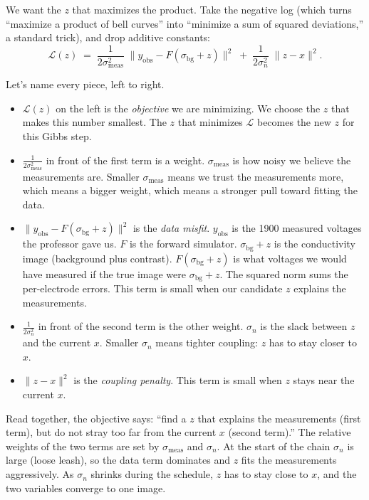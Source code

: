 \documentclass[11pt]{article}
\newcommand{\norm}[1]{\lVert #1 \rVert}
\begin{document}
We want the $z$ that maximizes the product. Take the negative log
(which turns ``maximize a product of bell curves'' into ``minimize a
sum of squared deviations,'' a standard trick), and drop additive
constants:
\[
\boxed{\;\;
\mathcal{L}(z)
\;=\;
\frac{1}{2 \sigma_{\text{meas}}^2}\;\norm{y_{\text{obs}} - F(\sigma_{\text{bg}} + z)}^2
\;+\;
\frac{1}{2 \sigma_n^2}\;\norm{z - x}^2. \;\;}
\]

Let's name every piece, left to right.

\begin{itemize}[leftmargin=2em]
\item $\mathcal{L}(z)$ on the left is the \emph{objective} we are
  minimizing. We choose the $z$ that makes this number smallest. The
  $z$ that minimizes $\mathcal{L}$ becomes the new $z$ for this Gibbs
  step.
\item $\frac{1}{2\sigma_{\text{meas}}^2}$ in front of the first term is
  a weight. $\sigma_{\text{meas}}$ is how noisy we believe the
  measurements are. Smaller $\sigma_{\text{meas}}$ means we trust the
  measurements more, which means a bigger weight, which means a
  stronger pull toward fitting the data.
\item $\norm{y_{\text{obs}} - F(\sigma_{\text{bg}} + z)}^2$ is the
  \emph{data misfit}. $y_{\text{obs}}$ is the 1900 measured voltages
  the professor gave us. $F$ is the forward simulator. $\sigma_{\text{bg}} + z$
  is the conductivity image (background plus contrast). $F(\sigma_{\text{bg}} + z)$
  is what voltages we would have measured if the true image were
  $\sigma_{\text{bg}} + z$. The squared norm sums the per-electrode
  errors. This term is small when our candidate $z$ explains the
  measurements.
\item $\frac{1}{2 \sigma_n^2}$ in front of the second term is the
  other weight. $\sigma_n$ is the slack between $z$ and the current
  $x$. Smaller $\sigma_n$ means tighter coupling: $z$ has to stay
  closer to $x$.
\item $\norm{z - x}^2$ is the \emph{coupling penalty}. This term is
  small when $z$ stays near the current $x$.
\end{itemize}

Read together, the objective says: ``find a $z$ that explains the
measurements (first term), but do not stray too far from the current
$x$ (second term).'' The relative weights of the two terms are set by
$\sigma_{\text{meas}}$ and $\sigma_n$. At the start of the chain
$\sigma_n$ is large (loose leash), so the data term dominates and $z$
fits the measurements aggressively. As $\sigma_n$ shrinks during the
schedule, $z$ has to stay close to $x$, and the two variables converge
to one image.
\end{document}
